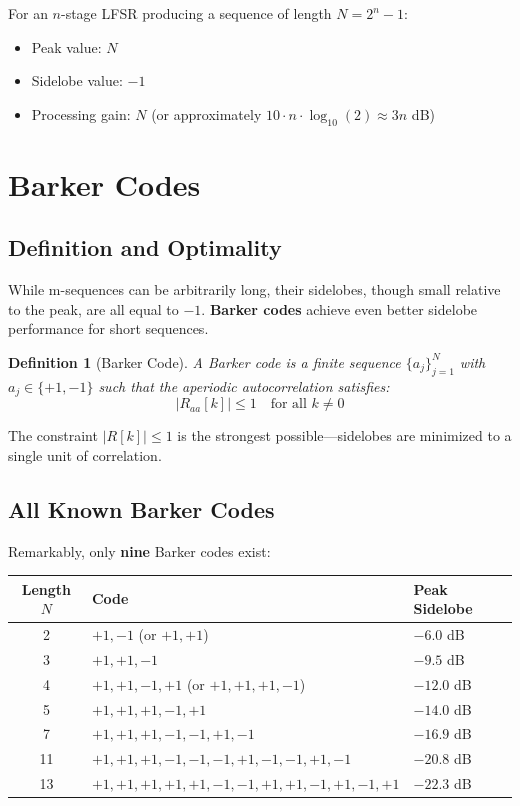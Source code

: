 \documentclass[11pt]{article}
\newtheorem{definition}{Definition}
\begin{document}
For an $n$-stage LFSR producing a sequence of length $N = 2^n - 1$:
\begin{itemize}
    \item Peak value: $N$
    \item Sidelobe value: $-1$
    \item Processing gain: $N$ (or approximately $10 \cdot n \cdot \log_{10}(2) \approx 3n$ dB)
\end{itemize}

\section{Barker Codes}

\subsection{Definition and Optimality}

While m-sequences can be arbitrarily long, their sidelobes, though small relative to the peak, are all equal to $-1$. \textbf{Barker codes} achieve even better sidelobe performance for short sequences.

\begin{definition}[Barker Code]
A Barker code is a finite sequence $\{a_j\}_{j=1}^{N}$ with $a_j \in \{+1, -1\}$ such that the aperiodic autocorrelation satisfies:
\begin{equation}
|R_{aa}[k]| \leq 1 \quad \text{for all } k \neq 0
\end{equation}
\end{definition}

The constraint $|R[k]| \leq 1$ is the strongest possible---sidelobes are minimized to a single unit of correlation.

\subsection{All Known Barker Codes}

Remarkably, only \textbf{nine} Barker codes exist:

\begin{center}
\begin{tabular}{cll}
\toprule
Length $N$ & Code & Peak Sidelobe \\
\midrule
2 & $+1, -1$ (or $+1, +1$) & $-6.0$ dB \\
3 & $+1, +1, -1$ & $-9.5$ dB \\
4 & $+1, +1, -1, +1$ (or $+1, +1, +1, -1$) & $-12.0$ dB \\
5 & $+1, +1, +1, -1, +1$ & $-14.0$ dB \\
7 & $+1, +1, +1, -1, -1, +1, -1$ & $-16.9$ dB \\
11 & $+1, +1, +1, -1, -1, -1, +1, -1, -1, +1, -1$ & $-20.8$ dB \\
13 & $+1, +1, +1, +1, +1, -1, -1, +1, +1, -1, +1, -1, +1$ & $-22.3$ dB \\
\bottomrule
\end{tabular}
\end{center}
\end{document}
